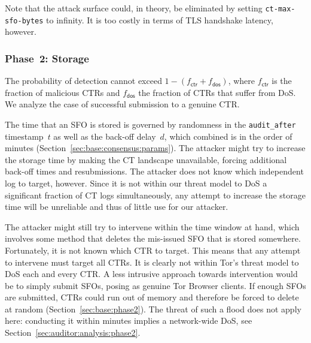 Note that the attack surface could, in theory, be eliminated by setting
\texttt{ct-max-sfo-bytes} to infinity.  It is too costly in terms of TLS
handshake latency, however.

\subsubsection{Phase~2: Storage} \label{sec:analysis:pr:phase2}
The probability of detection cannot exceed $1-(f_{\mathsf{ctr}} +
f_{\mathsf{dos}})$, where $f_{\mathsf{ctr}}$ is the fraction of
malicious CTRs and $f_{\mathsf{dos}}$ the fraction of CTRs that suffer from
DoS.  We analyze the case of successful submission to a genuine CTR.

The time that an SFO is stored is governed by randomness in the
\texttt{audit\_after} timestamp~$t$ as well as the back-off delay~$d$,
which combined is in the order of minutes
	(Section~\ref{sec:base:consensus:params}).
The attacker might try to increase the storage time by making the CT landscape
unavailable, forcing additional back-off times and resubmissions.  The attacker
does not know which independent log to target, however.  Since it is not within
our threat model to DoS a significant fraction of CT logs simultaneously, any
attempt to increase the storage time will be unreliable and thus of little use
for our attacker.

The attacker might still try to intervene within the time window at hand, which
involves some method that deletes the mis-issued SFO that is stored somewhere.
Fortunately, it is not known which CTR to target.
This means that any attempt to intervene must target all CTRs.  It is clearly
not within Tor's threat model to DoS each and every CTR.  A less intrusive
approach towards intervention would be to simply submit SFOs, posing as genuine
Tor Browser clients.  If enough SFOs are submitted, CTRs could run out of memory
and therefore be forced to delete at random (Section~\ref{sec:base:phase2}).
The threat of such a flood does not apply here:
	conducting it within minutes implies a network-wide DoS,
	see Section~\ref{sec:auditor:analysis:phase2}.

